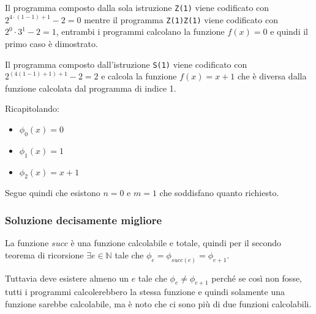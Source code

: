  Il programma composto dalla sola istruzione \texttt{Z(1)} viene codificato con $2^{4\cdot(1 -1) +1} -2 = 0$ mentre il programma \texttt{Z(1)Z(1)} viene codificato con $2^{0}\cdot 3^1 -2 = 1$, entrambi i programmi calcolano la funzione $f(x) = 0$ e quindi il primo caso è dimostrato.
 
 Il programma composto dall'istruzione \texttt{S(1)} viene codificato con $2^{(4(1-1) +1) + 1} -2 = 2$ e calcola la funzione $f(x) = x +1$ che è diversa dalla funzione calcolata dal programma di indice 1.
 
 Ricapitolando:
 
 \begin{itemize}
 	\item $\phi_0(x) = 0$
 	\item $\phi_1(x) = 1$
 	\item $\phi_2(x) = x+1$
 \end{itemize}
 
 Segue quindi che esistono $n=0$ e $m=1$ che soddisfano quanto richiesto.
 
 \subsubsection{Soluzione decisamente migliore}
 
 La funzione $succ$ è una funzione calcolabile e totale, quindi per il secondo teorema di ricorsione $\exists e \in \mathbb{N}$ tale che $\phi_e = \phi_{succ(e)} = \phi_{e+1}$.
 
 Tuttavia deve esistere almeno un $e$ tale che $\phi_e \neq \phi_{e+1}$ perché se così non fosse, tutti i programmi calcolerebbero la stessa funzione e quindi solamente una funzione sarebbe calcolabile, ma è noto che ci sono più di due funzioni calcolabili.